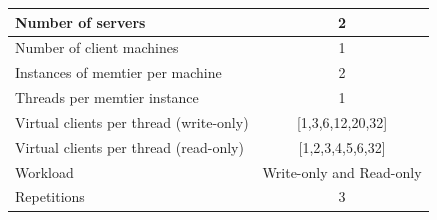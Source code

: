 \documentclass[11pt,a4paper]{article}
\begin{document}
\begin{center}
	\scriptsize{
		\begin{tabular}{|l|c|}
			\hline Number of servers                        & 2                        \\ 
			\hline Number of client machines                & 1                        \\ 
			\hline Instances of memtier per machine         & 2                        \\ 
			\hline Threads per memtier instance             & 1                        \\
			\hline Virtual clients per thread (write-only)  & [1,3,6,12,20,32]         \\ 
			\hline Virtual clients per thread (read-only)   & [1,2,3,4,5,6,32]         \\ 
			\hline Workload                                 & Write-only and Read-only \\
			\hline Repetitions                              & 
			3                        \\ 
			\hline 
		\end{tabular}
	} 
\end{center}
\end{document}

